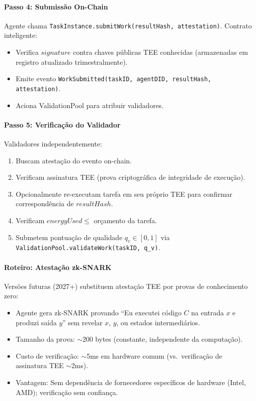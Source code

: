 \documentclass[11pt]{article}
\begin{document}
\begin{itemize}[noitemsep]
\begin{itemize}[noitemsep]
\begin{itemize}[noitemsep]
\paragraph{Passo 4: Submissão On-Chain}
Agente chama \texttt{TaskInstance.submitWork(resultHash, attestation)}. Contrato inteligente:
\begin{itemize}[noitemsep]
  \item Verifica $signature$ contra chaves públicas TEE conhecidas (armazenadas em registro atualizado trimestralmente).
  \item Emite evento \texttt{WorkSubmitted(taskID, agentDID, resultHash, attestation)}.
  \item Aciona ValidationPool para atribuir validadores.
\end{itemize}

\paragraph{Passo 5: Verificação do Validador}
Validadores independentemente:
\begin{enumerate}[noitemsep]
  \item Buscam atestação do evento on-chain.
  \item Verificam assinatura TEE (prova criptográfica de integridade de execução).
  \item Opcionalmente re-executam tarefa em seu próprio TEE para confirmar correspondência de $resultHash$.
  \item Verificam $energyUsed \leq$ orçamento da tarefa.
  \item Submetem pontuação de qualidade $q_v \in [0,1]$ via \texttt{ValidationPool.validateWork(taskID, q\_v)}.
\end{enumerate}

\paragraph{Roteiro: Atestação zk-SNARK}
Versões futuras (2027+) substituem atestação TEE por provas de conhecimento zero:
\begin{itemize}[noitemsep]
  \item Agente gera zk-SNARK provando ``Eu executei código $C$ na entrada $x$ e produzi saída $y$'' sem revelar $x$, $y$, ou estados intermediários.
  \item Tamanho da prova: $\sim$200 bytes (constante, independente da computação).
  \item Custo de verificação: $\sim$5ms em hardware comum (vs.\ verificação de assinatura TEE $\sim$2ms).
  \item Vantagem: Sem dependência de fornecedores específicos de hardware (Intel, AMD); verificação sem confiança.
\end{itemize}


\end{itemize}
\end{itemize}
\end{itemize}
\end{document}

